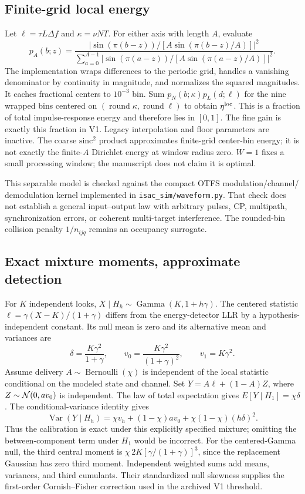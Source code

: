 \documentclass[10pt]{article}
\begin{document}
\subsection{Finite-grid local energy}
Let $\ell=\tau L\Delta f$ and $\kappa=\nu NT$.
For either axis with length $A$, evaluate
\[
 p_A(b;z)=
 \frac{\left|\sin(\pi(b-z))/[A\sin(\pi(b-z)/A)]\right|^2}
 {\sum_{a=0}^{A-1}\left|\sin(\pi(a-z))/[A\sin(\pi(a-z)/A)]\right|^2}.
\]
The implementation wraps differences to the periodic grid, handles a vanishing
denominator by continuity in magnitude, and normalizes the squared magnitudes.
It caches fractional centers to $10^{-3}$ bin. Sum
$p_N(b;\kappa)p_L(d;\ell)$ for the nine wrapped bins centered on
$(\operatorname{round}\kappa,\operatorname{round}\ell)$ to obtain
$\eta^{\rm loc}$. This is a fraction of total impulse-response energy and
therefore lies in $[0,1]$. The fine gain is exactly this fraction in V1.
Legacy interpolation and floor parameters are inactive. The coarse
$\mathrm{sinc}^2$ product approximates finite-grid center-bin energy; it is
not exactly the finite-$A$ Dirichlet energy at window radius zero.
$W=1$ fixes a small processing window; the manuscript does not claim it is optimal.

This separable model is checked against the compact OTFS modulation/channel/
demodulation kernel implemented in \texttt{isac\_sim/waveform.py}. That check
does not establish a general input--output law with arbitrary pulses, CP,
multipath, synchronization errors, or coherent multi-target interference.
The rounded-bin collision penalty $1/n_{ijq}$ remains an occupancy surrogate.

\subsection{Exact mixture moments, approximate detection}
For $K$ independent looks, $X\mid H_h\sim\operatorname{Gamma}(K,1+h\gamma)$.
The centered statistic $\ell=\gamma(X-K)/(1+\gamma)$ differs from the
energy-detector LLR by a hypothesis-independent constant. Its null mean is
zero and its alternative mean and variances are
\[
 \delta=\frac{K\gamma^2}{1+\gamma},\qquad
 v_0=\frac{K\gamma^2}{(1+\gamma)^2},\qquad v_1=K\gamma^2 .
\]
Assume delivery $A\sim\operatorname{Bernoulli}(\chi)$ is independent of the
local statistic conditional on the modeled state and channel. Set
$Y=A\ell+(1-A)Z$, where $Z\sim{\cal N}(0,av_0)$ is independent.
The law of total expectation gives $E[Y\mid H_1]=\chi\delta$.
The conditional-variance identity gives
\[
 \operatorname{Var}(Y\mid H_h)
 =\chi v_h+(1-\chi)av_0+\chi(1-\chi)(h\delta)^2 .
\]
Thus the calibration is exact under this explicitly specified mixture;
omitting the between-component term under $H_1$ would be incorrect.
For the centered-Gamma null, the third central moment is
$\chi\,2K[\gamma/(1+\gamma)]^3$, since the replacement Gaussian has zero third
moment. Independent weighted sums add means, variances, and third cumulants.
Their standardized null skewness supplies the first-order Cornish--Fisher
correction used in the archived V1 threshold.
\end{document}
